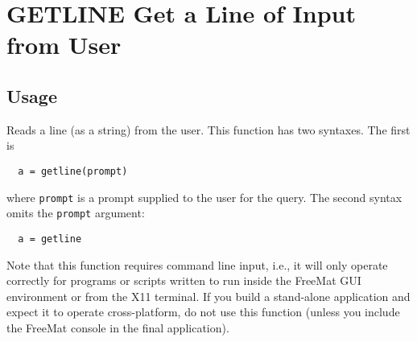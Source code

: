 \section{GETLINE Get a Line of Input from User}

\subsection{Usage}

Reads a line (as a string) from the user.  This function has
two syntaxes.  The first is 
\begin{verbatim}
  a = getline(prompt)
\end{verbatim}
where \verb|prompt| is a prompt supplied to the user for the query.
The second syntax omits the \verb|prompt| argument:
\begin{verbatim}
  a = getline
\end{verbatim}
Note that this function requires command line input, i.e., it 
will only operate correctly for programs or scripts written
to run inside the FreeMat GUI environment or from the X11 terminal.
If you build a stand-alone application and expect it to operate 
cross-platform, do not use this function (unless you include
the FreeMat console in the final application).

